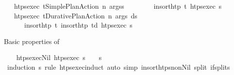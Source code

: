 \begin{isabellebody}
\ \ {\isacharbar}{\kern0pt}\ {\isachardoublequoteopen}htps{\isacharunderscore}{\kern0pt}exec\ {\isacharparenleft}{\kern0pt}{\isacharparenleft}{\kern0pt}t\isactrlsub {\isasympi}{\isacharcomma}{\kern0pt}Simple{\isacharunderscore}{\kern0pt}Plan{\isacharunderscore}{\kern0pt}Action\ n\ args{\isacharparenright}{\kern0pt}{\isacharhash}{\kern0pt}{\isasympi}s{\isacharparenright}{\kern0pt}\ {\isacharequal}{\kern0pt}\ \isanewline
\ \ \ \ \ \ insort{\isacharunderscore}{\kern0pt}htp\ t\isactrlsub {\isasympi}\ {\isacharparenleft}{\kern0pt}htps{\isacharunderscore}{\kern0pt}exec\ {\isasympi}s{\isacharparenright}{\kern0pt}{\isachardoublequoteclose}\isanewline
\ \ {\isacharbar}{\kern0pt}\ {\isachardoublequoteopen}htps{\isacharunderscore}{\kern0pt}exec\ {\isacharparenleft}{\kern0pt}{\isacharparenleft}{\kern0pt}t\isactrlsub {\isasympi}{\isacharcomma}{\kern0pt}Durative{\isacharunderscore}{\kern0pt}Plan{\isacharunderscore}{\kern0pt}Action\ n\ args\ d{\isacharparenright}{\kern0pt}{\isacharhash}{\kern0pt}{\isasympi}s{\isacharparenright}{\kern0pt}\ {\isacharequal}{\kern0pt}\ \isanewline
\ \ \ \ \ \ insort{\isacharunderscore}{\kern0pt}htp\ t\isactrlsub {\isasympi}\ {\isacharparenleft}{\kern0pt}insort{\isacharunderscore}{\kern0pt}htp\ {\isacharparenleft}{\kern0pt}t\isactrlsub {\isasympi}{\isacharplus}{\kern0pt}d{\isacharparenright}{\kern0pt}\ {\isacharparenleft}{\kern0pt}htps{\isacharunderscore}{\kern0pt}exec\ {\isasympi}s{\isacharparenright}{\kern0pt}{\isacharparenright}{\kern0pt}{\isachardoublequoteclose}%
\begin{isamarkuptext}%
Basic properties of %
\end{isamarkuptext}\isamarkuptrue%
\ \ \isamarkupfalse%
\ htps{\isacharunderscore}{\kern0pt}exec{\isacharunderscore}{\kern0pt}Nil{\isacharcolon}{\kern0pt}\ {\isachardoublequoteopen}htps{\isacharunderscore}{\kern0pt}exec\ {\isasympi}s\ {\isacharequal}{\kern0pt}\ {\isacharbrackleft}{\kern0pt}{\isacharbrackright}{\kern0pt}\ {\isasymlongleftrightarrow}\ {\isasympi}s\ {\isacharequal}{\kern0pt}\ {\isacharbrackleft}{\kern0pt}{\isacharbrackright}{\kern0pt}{\isachardoublequoteclose}\isanewline
%
\isadelimproof
\ \ \ \ %
\endisadelimproof
%
\isatagproof
{}\isamarkupfalse%
\ {\isacharparenleft}{\kern0pt}induction\ {\isasympi}s\ rule{\isacharcolon}{\kern0pt}\ htps{\isacharunderscore}{\kern0pt}exec{\isachardot}{\kern0pt}induct{\isacharparenright}{\kern0pt}\ {\isacharparenleft}{\kern0pt}auto\ simp{\isacharcolon}{\kern0pt}\ insort{\isacharunderscore}{\kern0pt}htps{\isacharunderscore}{\kern0pt}non{\isacharunderscore}{\kern0pt}Nil\ split{\isacharcolon}{\kern0pt}\ if{\isacharunderscore}{\kern0pt}splits{\isacharparenright}{\kern0pt}%

\end{isabellebody}
